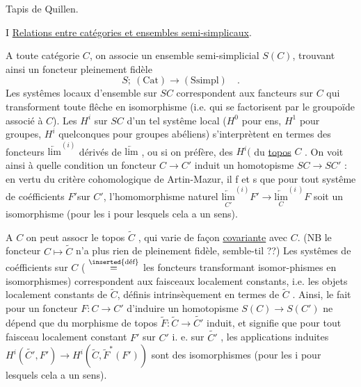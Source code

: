 
Tapis de Quillen.

I \quad \uline{Relations entre catégories et ensembles semi-simplicaux}.

A toute catégorie $C$, on associe un ensemble semi-simplicial $S(C)$,
trouvant ainsi un foncteur pleinement fidèle 
\[ S;\ (\mathrm{Cat}) \longrightarrow (\mathrm{Ssimpl})\quad . \]
 Les systêmes locaux d'ensemble sur $SC$ correspondent
aux fancteurs sur $C$ qui transforment toute flêche en isomorphisme (i.e.
qui se factorisent par le groupoïde associé à $C$). Les $H^i$ sur $SC$ d'un tel
systême local ($H^0$ pour ens, $H^1$ pour groupes, $H^i$ quelconques pour groupes
abéliens) s'interprètent en termes des foncteurs $\underleftarrow{\mathrm{lim}}^{(i)}$ dérivés de $\underleftarrow{\mathrm{lim}}$ ,
ou si on préfère, des $H^i($ du \uline{topos} $C$ . On voit ainsi à quelle condition
un foncteur $C \to C'$ induit un homotopisme $SC \to SC'$ : en vertu du
critère cohomologique de Artin-Mazur, il f et s que pour tout systême
de coéfficients $F'$sur $C'$, l'homomorphisme naturel $\underset{C'}{\underleftarrow{\mathrm{lim}}}^{(i)}F' \longrightarrow \underset{C}{\underleftarrow{\mathrm{lim}}}^{(i\ )}F$
soit un isomorphisme (pour les i pour lesquels cela a un sens). 

A $C$ on peut assocr le topos $\widetilde{C}$ , qui varie de façon \uline{covariante} avec $C$.
(NB le foncteur $C \mapsto \widetilde{C}$ n'a plus rien de pleinement fidèle, semble-t\deleted{\unsure{-}}il ??)
Les systêmes de coéfficients  sur $C$ ( $\overset{\text{\inserted{déf}}}{=}$ les foncteurs  transformant isomor-phismes en isomorphismes) correspondent aux faisceaux localement constant\deleted{,}s,
i.e. les objets localement constants de $\widetilde{C}$, définis intrinsèquement en termes
de $\widetilde{C}$ . Ainsi, le fait pour un foncteur $F:C \to C'$ d'induire un
homotopisme $S(C) \to S(C')$ ne dépend que du morphisme de topos $\widetilde{F}: \widetilde{C} \to \widetilde{C'}$
induit, et signifie que pour tout faisceau localement constant $F'$ sur $C'$ i.
e. sur $\widetilde{C'}$ , les applications induites $H^i(\widetilde{C'},F') \longrightarrow H^i(\widetilde{C},\widetilde{F}^{*}(F'))$
sont des isomorphismes (pour les i pour lesquels cela a un sens).

